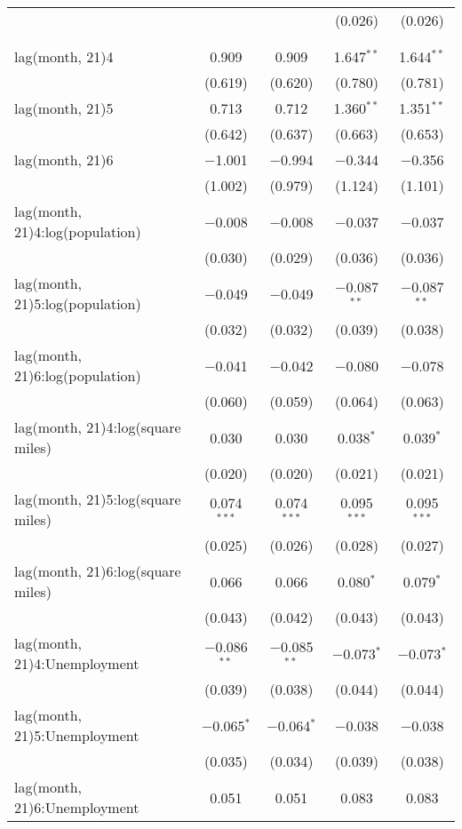 \begin{tabular}{@{\extracolsep{1pt}}lcccc}
  &  &  & (0.026) & (0.026) \\ 
   &  &  &  &  \\ 
  &  &  &  &  \\ 
  lag(month, 21)4 & 0.909 & 0.909 & 1.647$^{**}$ & 1.644$^{**}$ \\ 
  & (0.619) & (0.620) & (0.780) & (0.781) \\ 
  lag(month, 21)5 & 0.713 & 0.712 & 1.360$^{**}$ & 1.351$^{**}$ \\ 
  & (0.642) & (0.637) & (0.663) & (0.653) \\ 
  lag(month, 21)6 & $-$1.001 & $-$0.994 & $-$0.344 & $-$0.356 \\ 
  & (1.002) & (0.979) & (1.124) & (1.101) \\ 
  lag(month, 21)4:log(population) & $-$0.008 & $-$0.008 & $-$0.037 & $-$0.037 \\ 
  & (0.030) & (0.029) & (0.036) & (0.036) \\ 
  lag(month, 21)5:log(population) & $-$0.049 & $-$0.049 & $-$0.087$^{**}$ & $-$0.087$^{**}$ \\ 
  & (0.032) & (0.032) & (0.039) & (0.038) \\ 
  lag(month, 21)6:log(population) & $-$0.041 & $-$0.042 & $-$0.080 & $-$0.078 \\ 
  & (0.060) & (0.059) & (0.064) & (0.063) \\ 
  lag(month, 21)4:log(square miles) & 0.030 & 0.030 & 0.038$^{*}$ & 0.039$^{*}$ \\ 
  & (0.020) & (0.020) & (0.021) & (0.021) \\ 
  lag(month, 21)5:log(square miles) & 0.074$^{***}$ & 0.074$^{***}$ & 0.095$^{***}$ & 0.095$^{***}$ \\ 
  & (0.025) & (0.026) & (0.028) & (0.027) \\ 
  lag(month, 21)6:log(square miles) & 0.066 & 0.066 & 0.080$^{*}$ & 0.079$^{*}$ \\ 
  & (0.043) & (0.042) & (0.043) & (0.043) \\ 
  lag(month, 21)4:Unemployment & $-$0.086$^{**}$ & $-$0.085$^{**}$ & $-$0.073$^{*}$ & $-$0.073$^{*}$ \\ 
  & (0.039) & (0.038) & (0.044) & (0.044) \\ 
  lag(month, 21)5:Unemployment & $-$0.065$^{*}$ & $-$0.064$^{*}$ & $-$0.038 & $-$0.038 \\ 
  & (0.035) & (0.034) & (0.039) & (0.038) \\ 
  lag(month, 21)6:Unemployment & 0.051 & 0.051 & 0.083 & 0.083 \\ 

\end{tabular}
